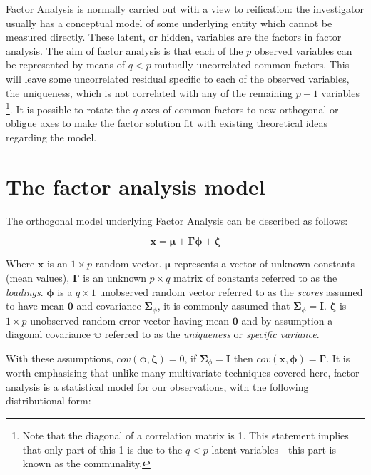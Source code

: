 Factor Analysis is normally carried out with a view to reification: the investigator usually has a conceptual model of some underlying entity which cannot be measured directly.   These latent, or hidden, variables are the factors in factor analysis.   The aim of factor analysis is that each of the $p$ observed variables can be represented by means of $q<p$ mutually uncorrelated common factors.   This will leave some uncorrelated residual specific to each of the observed variables, the uniqueness, which is not correlated with any of the remaining $p-1$ variables \footnote{Note that the diagonal of a correlation matrix is 1. This statement implies that only part of this 1 is due to the $q<p$ latent variables - this part is known as the communality.}.   It is possible to rotate the $q$ axes of common factors to new orthogonal or obligue axes to make the factor solution fit with existing theoretical ideas regarding the model.  

\section{The factor analysis model}
\label{factanalmodel}

The orthogonal model underlying Factor Analysis can be described as follows:

\begin{displaymath}
\label{factanal}
\boldsymbol{x} = \boldsymbol{\mu} + \boldsymbol{\Gamma} \boldsymbol{\phi} + \boldsymbol{\zeta}
\end{displaymath}

Where $\boldsymbol{x}$ is an $1 \times p$ random vector.   $\boldsymbol{\mu}$ represents a vector of unknown constants (mean values), $\boldsymbol{\Gamma}$ is an unknown $p \times q$ matrix of constants referred to as the \textit{loadings}.   $\boldsymbol{\phi}$ is a $q \times 1$ unobserved random vector referred to as the \textit{scores} assumed to have mean $\boldsymbol{0}$ and covariance $\boldsymbol{\Sigma}_{\phi}$, it is commonly assumed that $\boldsymbol{\Sigma}_{\phi} = \boldsymbol{I}$.   $\boldsymbol{\zeta}$ is $1 \times p$ unobserved random error vector having mean $\boldsymbol{0}$ and by assumption a diagonal covariance $\boldsymbol{\psi}$ referred to as the \textit{uniqueness} or \textit{specific variance}.   

With these assumptions, $cov(\boldsymbol{\phi}, \boldsymbol{\zeta}) = 0$, if $\boldsymbol{\Sigma}_{\phi} = \boldsymbol{I}$ then $cov(\boldsymbol{x}, \boldsymbol{\phi}) = \boldsymbol{\Gamma}$.   It is worth emphasising that unlike many multivariate techniques covered here, factor analysis is a statistical model for our observations, with the following distributional form:


